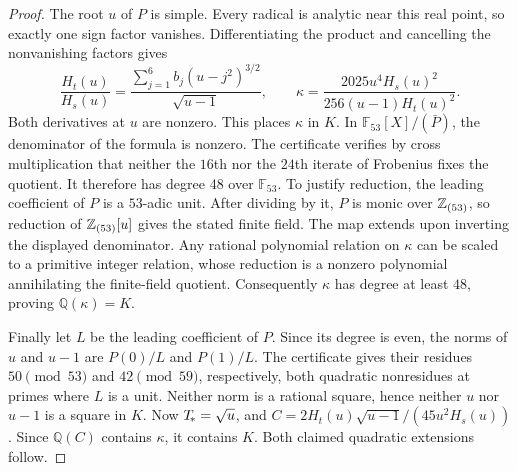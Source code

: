 \begin{proof}
The root $u$ of $P$ is simple. Every radical is analytic near this real
point, so exactly one sign factor vanishes. Differentiating the product
and cancelling the nonvanishing factors gives
\[
 \frac{H_t(u)}{H_s(u)}
 =\frac{\sum_{j=1}^6 b_j(u-j^2)^{3/2}}{\sqrt{u-1}},
 \qquad
 \kappa=\frac{2025u^4 H_s(u)^2}{256(u-1)H_t(u)^2}.
\]
Both derivatives at $u$ are nonzero. This places $\kappa$ in $K$.
In $\mathbb F_{53}[X]/(\bar P)$, the denominator of the formula is
nonzero. The certificate verifies by cross multiplication that neither
the $16$th nor the $24$th iterate of Frobenius fixes the quotient.
It therefore has degree $48$ over $\mathbb F_{53}$. To justify reduction,
the leading coefficient of $P$ is a $53$-adic unit. After dividing by it,
$P$ is monic over $\mathbb Z_{(53)}$, so reduction of $\mathbb Z_{(53)}[u]$
gives the stated finite field. The map extends upon inverting the displayed
denominator. Any rational polynomial relation on $\kappa$ can be scaled to
a primitive integer relation, whose reduction is a nonzero polynomial
annihilating the finite-field quotient. Consequently $\kappa$ has degree
at least $48$, proving $\mathbb Q(\kappa)=K$.

Finally let $L$ be the leading coefficient of $P$. Since its degree is even,
the norms of $u$ and $u-1$ are $P(0)/L$ and $P(1)/L$. The certificate
gives their residues $50\pmod {53}$ and $42\pmod {59}$, respectively,
both quadratic nonresidues at primes where $L$ is a unit. Neither norm is
a rational square, hence neither $u$ nor $u-1$ is a square in $K$.
Now $T_{\!*}=\sqrt u$, and
$C=2H_t(u)\sqrt{u-1}/(45u^2 H_s(u))$. Since $\mathbb Q(C)$ contains
$\kappa$, it contains $K$. Both claimed quadratic extensions follow.
\end{proof}
